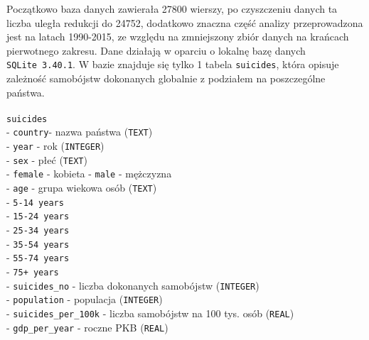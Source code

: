 \documentclass[11pt]{article}
\begin{document}
Początkowo baza danych zawierała 27800 wierszy, po czyszczeniu danych ta
liczba uległa redukcji do 24752, dodatkowo znaczna część analizy
przeprowadzona jest na latach 1990-2015, ze względu na zmniejszony zbiór
danych na krańcach pierwotnego zakresu. Dane działają w oparciu o
lokalnę bazę danych \texttt{SQLite\ 3.40.1}. W bazie znajduje się tylko
1 tabela \texttt{suicides}, która opisuje zależność samobójstw
dokonanych globalnie z podziałem na poszczególne państwa. \\ \\
\texttt{suicides} \\
\hspace*{1em}- \texttt{country}- nazwa państwa (\texttt{TEXT}) \\
\hspace*{1em}- \texttt{year} - rok (\texttt{INTEGER}) \\
\hspace*{1em}- \texttt{sex} - płeć (\texttt{TEXT}) \\
\hspace*{1em}- \texttt{female} - kobieta - \texttt{male} - mężczyzna \\
\hspace*{1em}- \texttt{age} - grupa wiekowa osób (\texttt{TEXT}) \\
\hspace*{2em}- \texttt{5-14\ years} \\
\hspace*{2em}- \texttt{15-24\ years} \\
\hspace*{2em}- \texttt{25-34\ years} \\
\hspace*{2em}- \texttt{35-54\ years} \\
\hspace*{2em}- \texttt{55-74\ years} \\
\hspace*{2em}- \texttt{75+\ years} \\
\hspace*{1em}- \texttt{suicides\_no} - liczba dokonanych samobójstw (\texttt{INTEGER}) \\
\hspace*{1em}- \texttt{population} - populacja (\texttt{INTEGER}) \\
\hspace*{1em}- \texttt{suicides\_per\_100k} - liczba samobójstw na 100 tys. osób (\texttt{REAL}) \\
\hspace*{1em}- \texttt{gdp\_per\_year} - roczne PKB (\texttt{REAL}) \\
\end{document}
